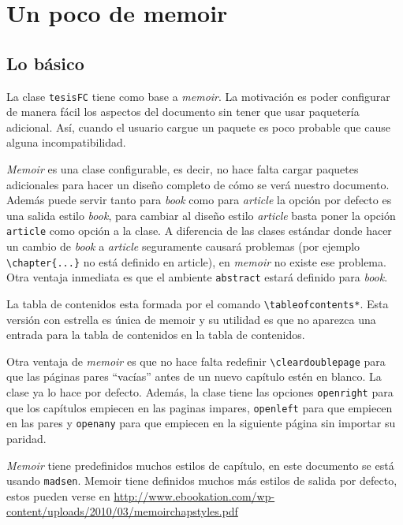
\chapter{Un poco de memoir}


\section{Lo básico}
La clase \texttt{tesisFC} tiene como base a \textit{memoir}. La motivación es poder configurar de manera fácil los aspectos del documento sin tener que usar paquetería adicional. Así, cuando el usuario cargue un paquete es poco probable que cause alguna incompatibilidad.

\textit{Memoir} es una clase configurable, es decir, no hace falta cargar paquetes adicionales para hacer un diseño completo de cómo se verá nuestro
documento. Además puede servir tanto para \textit{book} como para \textit{article} la opción por defecto es una salida estilo \textit{book}, para cambiar al diseño estilo \textit{article} basta poner la opción \texttt{article} como opción a la clase. A diferencia de las clases
estándar donde hacer un cambio de \textit{book} a \textit{article} seguramente causará problemas (por ejemplo \verb|\chapter{...}| no está
definido en article), en \textit{memoir} no existe ese problema. Otra ventaja inmediata es que el ambiente \texttt{abstract} estará definido para \textit{book}.

La tabla de contenidos esta formada por el comando
\verb|\tableofcontents*|. Esta versión con estrella es única de memoir y su
utilidad es que no aparezca una entrada para la tabla de contenidos en la
tabla de contenidos.

Otra ventaja de \textit{memoir} es que no hace falta redefinir
\verb|\cleardoublepage| para que las páginas pares ``vacías'' antes de un
nuevo capítulo estén en blanco. La clase ya lo hace por defecto. Además, la
clase tiene las opciones \texttt{openright} para que los capítulos empiecen
en las paginas impares, \texttt{openleft} para que empiecen en las pares y
\texttt{openany} para que empiecen en la siguiente página sin importar su
paridad.

\textit{Memoir} tiene predefinidos muchos estilos de capítulo, en este documento se está usando \texttt{madsen}. Memoir tiene
definidos muchos más estilos de salida por defecto, estos pueden verse en
\url{http://www.ebookation.com/wp-content/uploads/2010/03/memoirchapstyles.pdf}

